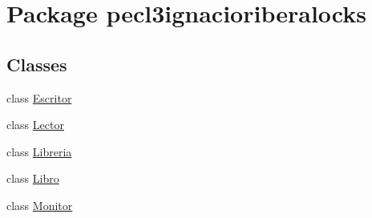 \hypertarget{namespacepecl3ignacioriberalocks}{}\section{Package pecl3ignacioriberalocks}
\label{namespacepecl3ignacioriberalocks}
\subsection*{Classes}
\begin{DoxyCompactItemize}
\item 
class \mbox{\hyperlink{classpecl3ignacioriberalocks_1_1_escritor}{Escritor}}
\item 
class \mbox{\hyperlink{classpecl3ignacioriberalocks_1_1_lector}{Lector}}
\item 
class \mbox{\hyperlink{classpecl3ignacioriberalocks_1_1_libreria}{Libreria}}
\item 
class \mbox{\hyperlink{classpecl3ignacioriberalocks_1_1_libro}{Libro}}
\item 
class \mbox{\hyperlink{classpecl3ignacioriberalocks_1_1_monitor}{Monitor}}
\end{DoxyCompactItemize}
